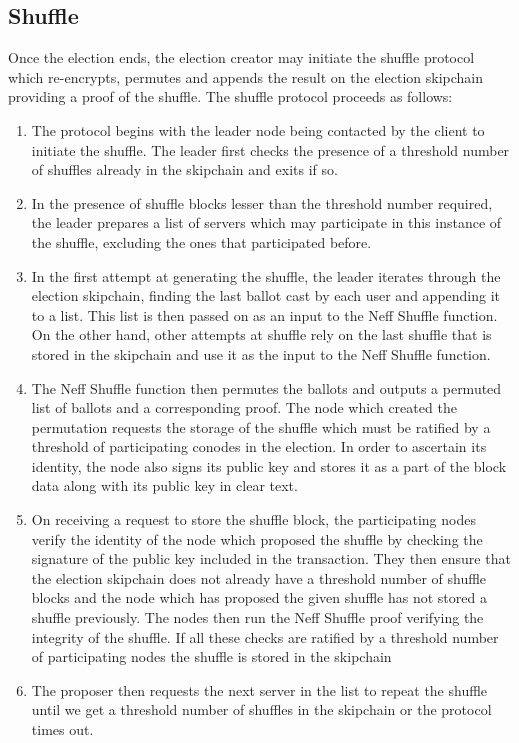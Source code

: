 \subsection{Shuffle}

Once the election ends, the election creator may initiate the shuffle protocol which re-encrypts, permutes and appends the result on the election skipchain providing a proof of the shuffle. The shuffle protocol proceeds as follows:

\begin{enumerate}
  \item The protocol begins with the leader node being contacted by the client to initiate the shuffle. The leader first checks the presence of a threshold number of shuffles already in the skipchain and exits if so.
  \item In the presence of shuffle blocks lesser than the threshold number required, the leader prepares a list of servers which may participate in this instance of the shuffle, excluding the ones that participated before.
  \item In the first attempt at generating the shuffle, the leader iterates through the election skipchain, finding the last ballot cast by each user and appending it to a list. This list is then passed on as an input to the Neff Shuffle function. On the other hand, other attempts at shuffle rely on the last shuffle that is stored in the skipchain and use it as the input to the Neff Shuffle function.
  \item The Neff Shuffle function then permutes the ballots and outputs a permuted list of ballots and a corresponding proof. The node which created the permutation requests the storage of the shuffle which must be ratified by a threshold of participating conodes in the election. In order to ascertain its identity, the node also signs its public key and stores it as a part of the block data along with its public key in clear text.
  \item On receiving a request to store the shuffle block, the  participating nodes verify the identity of the node which proposed the shuffle by checking the signature of the public key included in the transaction. They then ensure that the election skipchain does not already have a threshold number of shuffle blocks and the node which has proposed the given shuffle has not stored a shuffle previously. The nodes then run the Neff Shuffle proof verifying the integrity of the shuffle. If all these checks are ratified by a threshold number of participating nodes the shuffle is stored in the skipchain
  \item The proposer then requests the next server in the list to repeat the shuffle until we get a threshold number of shuffles in the skipchain or the protocol times out.
\end{enumerate}


